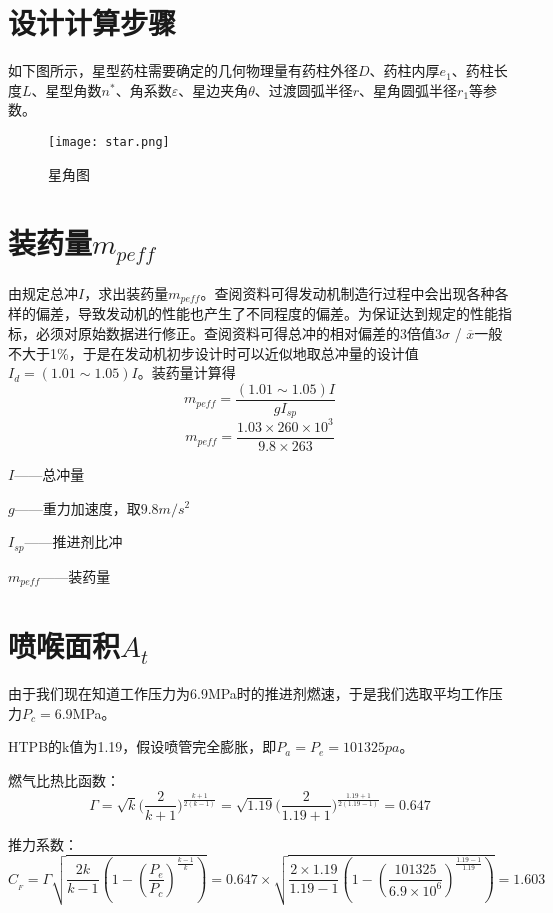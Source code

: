 \section{设计计算步骤}

如下图所示，星型药柱需要确定的几何物理量有药柱外径$D$、药柱内厚$e_{1}$、药柱长度$L$、星型角数$n^{*}$、角系数$\varepsilon $、星边夹角$\theta $、过渡圆弧半径$r$、星角圆弧半径$r_{1}$等参数。

\begin{figure}
  \centering
  \texttt{[image: star.png]}
  \caption{星角图}
  \label{fig:star}
\end{figure}

\section{装药量$m_{peff}$}

由规定总冲$I$，求出装药量$m_{peff}$。查阅资料可得发动机制造行过程中会出现各种各样的偏差，导致发动机的性能也产生了不同程度的偏差。为保证达到规定的性能指标，必须对原始数据进行修正。查阅资料可得总冲的相对偏差的3倍值$3\sigma $ / $\overline{x}$一般不大于1\%，于是在发动机初步设计时可以近似地取总冲量的设计值$I_{d}=(1.01\sim 1.05)I$。装药量计算得
\[
  m_{peff}=\frac{(1.01\sim 1.05)I}{gI_{sp}}
  \]
  \[
m_{peff}=\frac{1.03\times 260\times 10^3}{9.8\times 263}
\]

$I$——总冲量

$g$——重力加速度，取$9.8m/s^{2}$

$I_{sp}$——推进剂比冲

$m_{peff}$——装药量

\section{喷喉面积$A_{t}$}

由于我们现在知道工作压力为6.9MPa时的推进剂燃速，于是我们选取平均工作压力$P_{c}=6.9$MPa。

HTPB的k值为1.19，假设喷管完全膨胀，即$P_{a}=P_{e}=101325pa$。

燃气比热比函数：
\[\Gamma =\sqrt{k}\bigl( \frac{2}{k+1} \bigr) ^{\frac{k+1}{2\left( k-1 \right)}}=\sqrt{1.19}\bigl( \frac{2}{1.19+1} \bigr) ^{\frac{1.19+1}{2\left( 1.19-1 \right)}}=0.647
\]

推力系数：
\[
C_{_F}=\Gamma \sqrt{\frac{2k}{k-1}(1-(\frac{P_e}{P_c})^{\frac{k-1}{k}})}=0.647\times \sqrt{\frac{2\times 1.19}{1.19-1}(1-(\frac{101325}{6.9\times 10^6})^{\frac{1.19-1}{1.19}})}=1.603
\]

